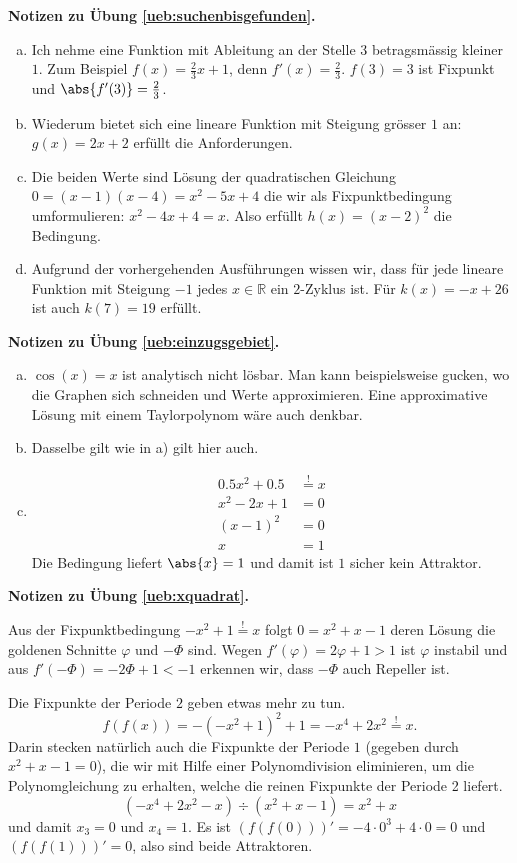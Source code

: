 \documentclass[%
11pt,%
twoside,%
titlepage,%
german,%
headsepline%
]{scrartcl}
\newcommand{\concatueb}[1]{ueb:#1}%
\newcommand{\concatlsg}[1]{lsg:#1}%
\newenvironment{lsg}[1]{%
    \par\noindent\textbf{Notizen zu Übung \ref{\concatueb{#1}}.}%
    \label{\concatlsg{#1}}
}{%
    \par%
}
\begin{document}
\begin{lsg}{suchenbisgefunden}	
\begin{enumerate}[a)]
\item Ich nehme eine Funktion mit Ableitung an der Stelle $3$ betragsmässig kleiner $1$. Zum Beispiel $f(x)=\frac{2}{3}x+1$, denn $f'(x)=\frac{2}{3}$. $f(3)=3$ ist Fixpunkt und $\abs{f'(3)}=\frac{2}{3}$.
\item Wiederum bietet sich eine lineare Funktion mit Steigung grösser $1$ an: $g(x)=2x+2$ erfüllt die Anforderungen.
\item Die beiden Werte sind Lösung der quadratischen Gleichung $0=(x-1)(x-4)=x^2-5x+4$ die wir als Fixpunktbedingung umformulieren: $x^2-4x+4=x$. Also erfüllt $h(x)=(x-2)^2$ die Bedingung.
\item Aufgrund der vorhergehenden Ausführungen wissen wir, dass für jede lineare Funktion mit Steigung $-1$ jedes $x\in\mathbb{R}$ ein $2$-Zyklus ist. Für $k(x)=-x+26$ ist auch $k(7)=19$ erfüllt.
\end{enumerate}
\end{lsg}
\begin{lsg}{einzugsgebiet}
    \begin{enumerate}[a)]
        \item $\cos(x)=x$ ist analytisch nicht lösbar. Man kann beispielsweise gucken, wo die Graphen sich schneiden und Werte approximieren. Eine approximative Lösung mit einem Taylorpolynom wäre auch denkbar.
        \item Dasselbe gilt wie in a) gilt hier auch.
        \item \begin{align*}
            0.5x^2+0.5 &\stackrel{!}{=} x\\
            x^2-2x+1 &= 0\\
            (x-1)^2 &= 0\\
            x &= 1
        \end{align*}
        Die Bedingung liefert $\abs{x}=1$ und damit ist $1$ sicher kein Attraktor.
    \end{enumerate}
\end{lsg}
\begin{lsg}{xquadrat}
    Aus der Fixpunktbedingung $-x^2+1\stackrel{!}{=}x$ folgt $0=x^2+x-1$ deren Lösung die goldenen Schnitte $\varphi$ und $-\Phi$ sind. Wegen $f'(\varphi)=2\varphi+1>1$ ist $\varphi$ instabil und aus $f'(-\Phi)=-2\Phi+1<-1$ erkennen wir, dass $-\Phi$ auch Repeller ist.

    Die Fixpunkte der Periode $2$ geben etwas mehr zu tun.
    $$f(f(x))=-(-x^2+1)^2+1=-x^4+2x^2\stackrel{!}{=}x.$$
    Darin stecken natürlich auch die Fixpunkte der Periode $1$ (gegeben durch $x^2+x-1=0$), die wir mit Hilfe einer Polynomdivision eliminieren, um die Polynomgleichung zu erhalten, welche die reinen Fixpunkte der Periode 2 liefert.
    $$(-x^4+2x^2-x)\div(x^2+x-1)=x^2+x$$
    und damit $x_3=0$ und $x_4=1$. Es ist $(f(f(0)))'=-4\cdot0^3+4\cdot0=0$ und $(f(f(1)))'=0$, also sind beide Attraktoren.
\end{lsg}
\end{document}
